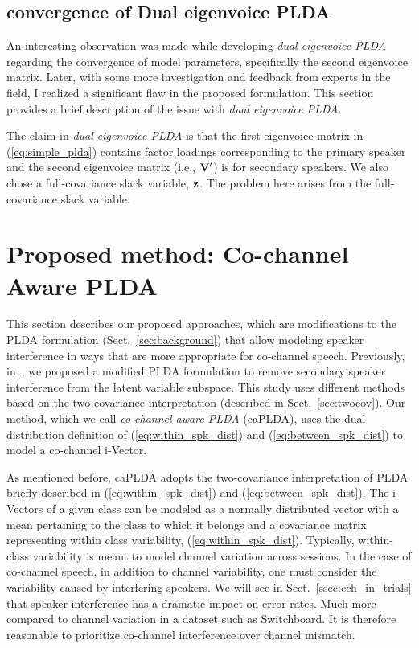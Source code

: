 \subsection{convergence of Dual eigenvoice PLDA}
\label{ssec:convergence_dualevplda}
An interesting observation was made while developing {\it dual eigenvoice PLDA} regarding the convergence of model parameters, specifically the second eigenvoice matrix. 
Later, with some more investigation and feedback from experts in the field, I realized a significant flaw in the proposed formulation. 
This section provides a brief description of the issue with {\it dual eigenvoice PLDA}. 

The claim in {\it dual eigenvoice PLDA} is that the first eigenvoice matrix in (\ref{eq:simple_plda}) contains factor loadings corresponding to the primary speaker and the second eigenvoice matrix (i.e., ${\bf V}^\prime$) is for secondary speakers. 
We also chose a full-covariance slack variable, ${\bf z}$. 
The problem here arises from the full-covariance slack variable. 


\section{Proposed method: Co-channel Aware PLDA}
\label{sec:cch_plda}
This section describes our proposed approaches, which are modifications to the PLDA formulation (Sect.~\ref{sec:background}) that allow modeling speaker interference in ways that are more appropriate for co-channel speech. 
Previously, in~\cite{shokouhi2015probabilistic}, we proposed a modified PLDA formulation to remove secondary speaker interference from the latent variable subspace. 
This study uses different methods based on the two-covariance interpretation (described in Sect.~\ref{sec:twocov}). 
Our method, which we call {\it co-channel aware PLDA} (caPLDA), uses the dual distribution definition of (\ref{eq:within_spk_dist}) and (\ref{eq:between_spk_dist}) to model a co-channel i-Vector. 

As mentioned before, caPLDA adopts the two-covariance interpretation of PLDA briefly described in (\ref{eq:within_spk_dist}) and (\ref{eq:between_spk_dist}). 
The i-Vectors of a given class can be modeled as a normally distributed vector with a mean pertaining to the class to which it belongs and a covariance matrix representing within class variability, (\ref{eq:within_spk_dist}). 
Typically, within-class variability is meant to model channel variation across sessions. 
In the case of co-channel speech, in addition to channel variability, one must consider the variability caused by interfering speakers. 
We will see in Sect.~\ref{ssec:cch_in_trials} that speaker interference has a dramatic impact on error rates. Much more compared to channel variation in a dataset such as Switchboard. 
It is therefore reasonable to prioritize co-channel interference over channel mismatch. 

